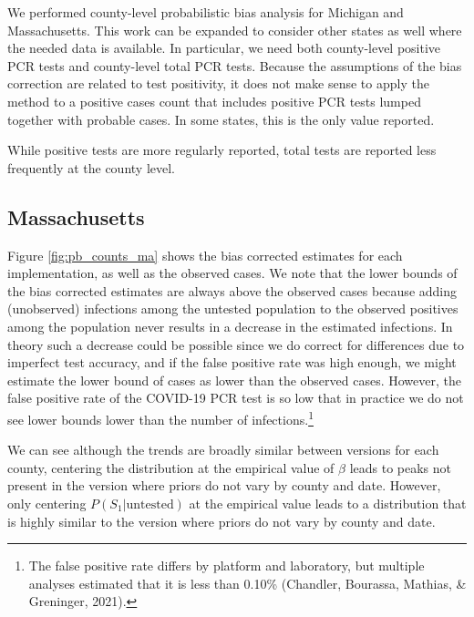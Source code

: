\documentclass[12pt,twoside]{smiththesis}
\begin{document}
We performed county-level probabilistic bias analysis for Michigan and Massachusetts. This work can be expanded to consider other states as well where the needed data is available. In particular, we need both county-level positive PCR tests and county-level total PCR tests. Because the assumptions of the bias correction are related to test positivity, it does not make sense to apply the method to a positive cases count that includes positive PCR tests lumped together with probable cases. In some states, this is the only value reported.

While positive tests are more regularly reported, total tests are reported less frequently at the county level.

\hypertarget{massachusetts}{%
\subsection{Massachusetts}\label{massachusetts}}

Figure \ref{fig:pb_counts_ma} shows the bias corrected estimates for each implementation, as well as the observed cases. We note that the lower bounds of the bias corrected estimates are always above the observed cases because adding (unobserved) infections among the untested population to the observed positives among the population never results in a decrease in the estimated infections. In theory such a decrease could be possible since we do correct for differences due to imperfect test accuracy, and if the false positive rate was high enough, we might estimate the lower bound of cases as lower than the observed cases. However, the false positive rate of the COVID-19 PCR test is so low that in practice we do not see lower bounds lower than the number of infections.\footnote{The false positive rate differs by platform and laboratory, but multiple analyses estimated that it is less than 0.10\% (Chandler, Bourassa, Mathias, \& Greninger, 2021).}

We can see although the trends are broadly similar between versions for each county, centering the distribution at the empirical value of \(\beta\) leads to peaks not present in the version where priors do not vary by county and date. However, only centering \(P(S_1|\text{untested})\) at the empirical value leads to a distribution that is highly similar to the version where priors do not vary by county and date.
\end{document}
